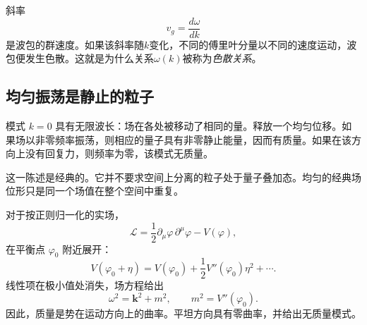 \begin{classroomqa}
\end{classroomqa}

斜率
\begin{equation}
  v_g=\frac{d\omega}{dk}
\end{equation}
是波包的群速度。如果该斜率随\(k\)变化，不同的傅里叶分量以不同的速度运动，波包便发生色散。这就是为什么关系\(\omega(k)\)被称为\emph{色散关系}。

\begin{classroomqa}
\end{classroomqa}

\subsection{均匀振荡是静止的粒子}

模式 \(k=0\) 具有无限波长：场在各处被移动了相同的量。释放一个均匀位移。如果场以非零频率振荡，则相应的量子具有非零静止能量，因而有质量。如果在该方向上没有回复力，则频率为零，该模式无质量。

这一陈述是经典的。它并不要求空间上分离的粒子处于量子叠加态。均匀的经典场位形只是同一个场值在整个空间中重复。

\begin{classroomqa}
\end{classroomqa}

对于按正则归一化的实场，
\begin{equation}
  \mathcal L
  =\frac12\partial_\mu\varphi\,\partial^\mu\varphi-V(\varphi),
\end{equation}
在平衡点 \(\varphi_0\) 附近展开：
\begin{equation}
  V(\varphi_0+\eta)
  =V(\varphi_0)
   +\frac12V''(\varphi_0)\eta^2+\cdots.
\end{equation}
线性项在极小值处消失，场方程给出
\begin{equation}
  \omega^2=\bm{k}^2+m^2,
  \qquad
  m^2=V''(\varphi_0).
  \label{eq:l08-curvature-mass}
\end{equation}
因此，质量是势在运动方向上的曲率。平坦方向具有零曲率，并给出无质量模式。

